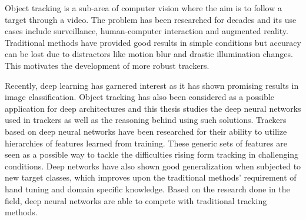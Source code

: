 
\begin{abstractpage}[english]
Object tracking is a sub-area of computer vision where the aim is to follow a target through a video. The problem has been researched for decades and its use cases include surveillance, human-computer interaction and augmented reality. Traditional methods have provided good results in simple conditions but accuracy can be lost due to distractors like motion blur and drastic illumination changes. This motivates the development of more robust trackers.

Recently, deep learning has garnered interest as it has shown promising results in image classification. Object tracking has also been considered as a possible application for deep architectures and this thesis studies the deep neural networks used in trackers as well as the reasoning behind using such solutions. Trackers based on deep neural networks have been researched for their ability to utilize hierarchies of features learned from training. These generic sets of features are seen as a possible way to tackle the difficulties rising form tracking in challenging conditions. Deep networks have also shown good generalization when subjected to new target classes, which improves upon the traditional methods' requirement of hand tuning and domain specific knowledge. Based on the research done in the field, deep neural networks are able to compete with traditional tracking methods.
\end{abstractpage}

\newpage
{}

